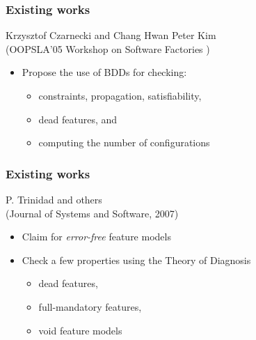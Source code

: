 \documentclass{beamer}
\begin{document}
\begin{frame}

\frametitle{Existing works}

Krzysztof Czarnecki and Chang Hwan Peter Kim \\ (OOPSLA'05 Workshop on Software Factories )

\begin{itemize}
\item Propose the use of BDDs for checking:
\begin{itemize}
\item constraints, propagation, satisfiability,
\item dead features, and 
\item computing the number of configurations
\end{itemize}
\end{itemize}

\end{frame}

\begin{frame}

\frametitle{Existing works}

P. Trinidad and others \\ (Journal of Systems and Software, 2007)

\begin{itemize}
\item Claim for \emph{error-free} feature models
\item Check a few properties using the Theory of Diagnosis 
\begin{itemize}
 \item dead features, 
 \item full-mandatory features, 
 \item void feature models 
\end{itemize}
\end{itemize}

\end{frame}

\section[Outline]{}

\frame{\tableofcontents}
\end{document}
